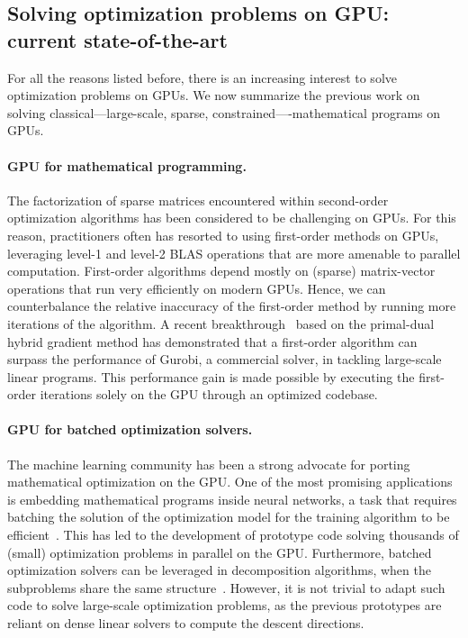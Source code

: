 \subsection{Solving optimization problems on GPU: current state-of-the-art}
For all the reasons listed before, there is an increasing interest to solve optimization problems on GPUs.
We now summarize the previous work on solving classical---large-scale, sparse, constrained----mathematical programs on GPUs.

\paragraph{GPU for mathematical programming.}
The factorization of sparse matrices encountered within second-order optimization algorithms has been considered to be challenging  on GPUs.
For this reason, practitioners often has resorted to using first-order
methods on GPUs, leveraging level-1 and level-2 BLAS operations that
are more amenable to parallel computation.
First-order algorithms depend mostly on (sparse) matrix-vector operations that run
very efficiently on modern GPUs. Hence, we can counterbalance
the relative inaccuracy of the first-order method by running more
iterations of the algorithm.
A recent breakthrough~\cite{lu2023cupdlp,lu2023cupdlp2} based on the primal-dual hybrid gradient method has demonstrated
that a first-order algorithm can surpass the performance of Gurobi, a
commercial solver, in tackling large-scale linear programs. This
performance gain is made possible by executing the first-order
iterations solely on the GPU through an optimized codebase.

\paragraph{GPU for batched optimization solvers.}
The machine learning community has been a strong advocate for porting
mathematical optimization on the GPU. One of the most promising
applications is embedding mathematical programs inside neural networks,
a task that requires batching the solution of the optimization model
for the training algorithm to be
efficient~\cite{amos2017optnet,pineda2022theseus}.  This has led to
the development of prototype code solving thousands of (small)
optimization problems in parallel on the GPU.
Furthermore, batched optimization solvers can be leveraged
in decomposition algorithms, when the subproblems share the same structure~\cite{kimLeveragingGPUBatching2021}.
However, it is not trivial to adapt such code to solve large-scale optimization problems,
as the previous prototypes are reliant on dense linear solvers to
compute the descent directions.

